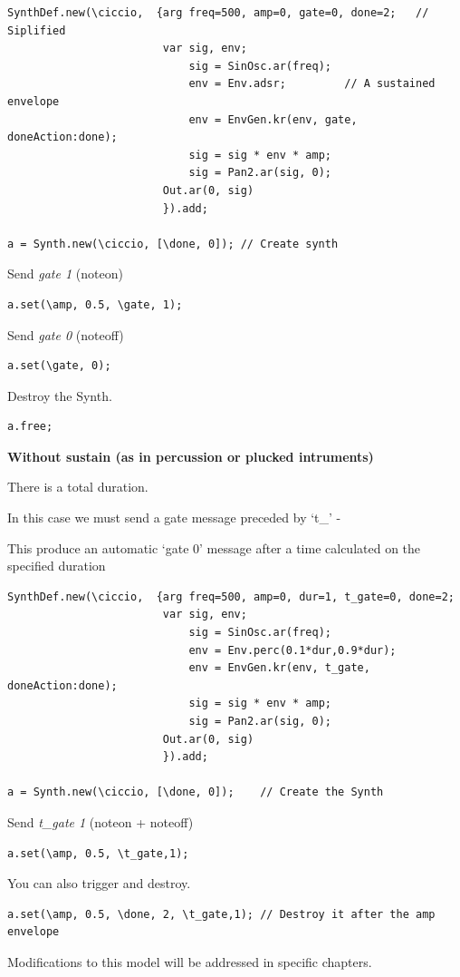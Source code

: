 \begin{lstlisting}[frame=single] 
SynthDef.new(\ciccio,  {arg freq=500, amp=0, gate=0, done=2;   // Siplified 
                        var sig, env;
                            sig = SinOsc.ar(freq);
                            env = Env.adsr;         // A sustained envelope
                            env = EnvGen.kr(env, gate, doneAction:done);
                            sig = sig * env * amp;
                            sig = Pan2.ar(sig, 0);
                        Out.ar(0, sig)
                        }).add;       
                                                
a = Synth.new(\ciccio, [\done, 0]); // Create synth
\end{lstlisting}
Send \textit{gate 1} (noteon)
\begin{lstlisting}[frame=single] 
a.set(\amp, 0.5, \gate, 1);
\end{lstlisting}
Send \textit{gate 0} (noteoff)
\begin{lstlisting}[frame=single] 
a.set(\gate, 0);
\end{lstlisting}
Destroy the Synth.
\begin{lstlisting}[frame=single] 
a.free;
\end{lstlisting}

\textbf{Without sustain (as in percussion or plucked intruments)}

There is a total duration.

In this case we must send a gate message preceded by `t\_' -

This produce an automatic `gate 0' message after a time calculated on the specified duration

\begin{lstlisting}[frame=single] 
SynthDef.new(\ciccio,  {arg freq=500, amp=0, dur=1, t_gate=0, done=2; 
                        var sig, env;
                            sig = SinOsc.ar(freq);
                            env = Env.perc(0.1*dur,0.9*dur);                     
                            env = EnvGen.kr(env, t_gate, doneAction:done);
                            sig = sig * env * amp;
                            sig = Pan2.ar(sig, 0);
                        Out.ar(0, sig)
                        }).add;      
                                                           
a = Synth.new(\ciccio, [\done, 0]);    // Create the Synth
\end{lstlisting}

Send \textit{t\_gate 1} (noteon + noteoff)

\begin{lstlisting}[frame=single] 
a.set(\amp, 0.5, \t_gate,1);
\end{lstlisting}

You can also trigger and destroy.

\begin{lstlisting}[frame=single] 
a.set(\amp, 0.5, \done, 2, \t_gate,1); // Destroy it after the amp envelope
\end{lstlisting}

Modifications to this model will be addressed in specific chapters.
